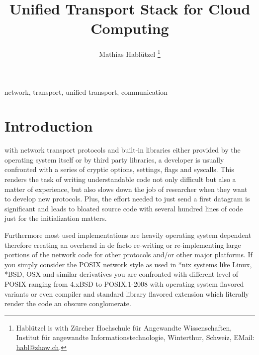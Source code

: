 \documentclass[twocolumn,english]{IEEEtran}
\theoremstyle{plain}
\theoremstyle{plain}
\begin{document}
\title{Unified Transport Stack for Cloud Computing}

\author{Mathias Hablützel \thanks{Hablützel is with Zürcher Hochschule für Angewandte Wissenschaften, Institut für
    angewandte Informationstechnologie, Winterthur, Schweiz, EMail:
    \protect\href{mailto:mathias.habluetzel@zhaw.ch}{habl@zhaw.ch}.
    }
}








\maketitle
\begin{abstract}

\end{abstract}
\begin{IEEEkeywords}
network, transport, unified transport, communication
\end{IEEEkeywords}


\section{Introduction}

 with network transport protocols and built-in
libraries either provided by the operating system itself or by third party
libraries, a developer is usually confronted with a series of cryptic options,
settings, flags and syscalls. This renders the task of writing understandable
code not only difficult but also a matter of experience, but also slows down
the job of researcher when they want to develop new protocols. Plus, the
effort needed to just send a first datagram is significant and leads to
bloated source code with several hundred lines of code just for the
initialization matters.

Furthermore most used implementations are heavily operating system dependent
therefore creating an overhead in de facto re-writing or re-implementing large
portions of the network code for other protocols and/or other major platforms.
If you simply consider the POSIX network style as used in *nix systems like
Linux, *BSD, OSX and similar derivatives you are confronted with different
level of POSIX ranging from 4.xBSD to POSIX.1-2008 with operating system
flavored variants or even compiler and standard library flavored extension
which literally render the code an obscure conglomerate.
\end{document}
